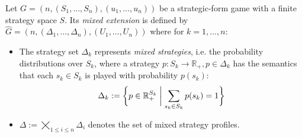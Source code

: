 \documentclass[a4paper]{scrreprt}
\newcommand{\Rp}{\mathbb{R}_+}
\begin{document}
    \begin{defn}
        Let $G = (n, (S_1,\dots, S_n), (u_1, \dots, u_n))$ be a strategic-form game with a finite strategy space $S$. %
        Its \emph{mixed extension} is defined by $\hat{G} = (n, (\Delta_1, \dots, \Delta_n), (U_1, \dots, U_n))$
        where for $k = 1,\dots,n$:
        \begin{itemize} %
%            
%            
            
            \item 
            The strategy set $\Delta_k$ represents \emph{mixed strategies}, i.e. the probability distributions over $S_k$, where a strategy $p : S_k \to \Rp, p \in \Delta_k$ has the semantics that each $s_k \in S_k$ is played with probability $p(s_k)$:   
            \[
                \Delta_k := \biggset{ p \in \Rp^{S_k} \biggmid \sum_{s_k \in S_k} p(s_k) = 1 } 
            \]
            
            \item $\Delta := \bigtimes\limits_{1\leq i \leq n} \Delta_i$ denotes the set of mixed strategy profiles.
            

\end{itemize}
\end{defn}
\end{document}
